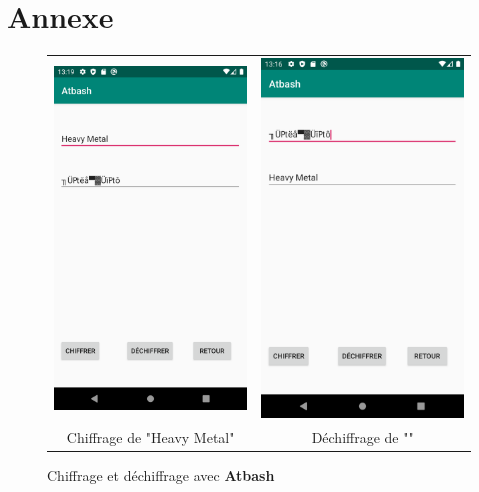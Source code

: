 \documentclass{article}
\begin{document}
\section{Annexe}

\begin{figure}[b!]
    \centering
    \begin{tabular}{cc}
      \includegraphics[width=.35\linewidth]{./img/atbash_e.png} &
      \includegraphics[width=.35\linewidth]{./img/atbash_d.png} \\
      Chiffrage de "Heavy Metal" & Déchiffrage de ""\\
    \end{tabular}
    \caption{Chiffrage et déchiffrage avec \textbf{Atbash}}\label{fig:atbash}
\end{figure}
\end{document}
